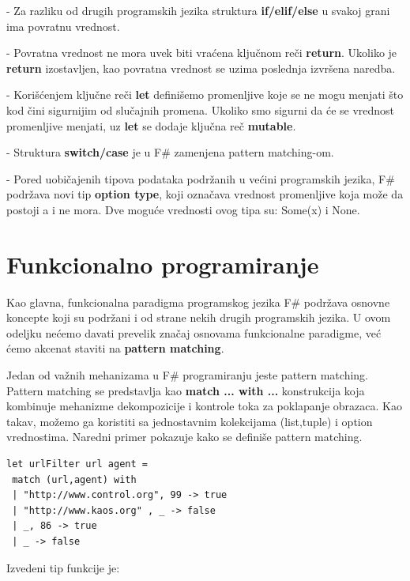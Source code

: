 \documentclass[a4paper]{article}
\begin{document}
	- Za razliku od drugih programskih jezika struktura \textbf{if/elif/else} u svakoj grani ima povratnu vrednost.
	 
	- Povratna vrednost ne mora uvek biti vraćena ključnom reči \textbf{return}. Ukoliko je \textbf{return} izostavljen, kao povratna vrednost se uzima poslednja izvršena naredba.
	 
	- Korišćenjem ključne reči \textbf{let} definišemo promenljive koje se ne mogu menjati što kod čini sigurnijim od slučajnih promena. Ukoliko smo sigurni da će se vrednost promenljive menjati, uz \textbf{let} se dodaje ključna reč \textbf{mutable}.
	 
	- Struktura \textbf{switch/case} je u F\# zamenjena pattern matching-om\cite{progFsPM}.
	 
	- Pored uobičajenih tipova podataka podržanih u većini programskih jezika, F\# podržava novi tip \textbf{option type}, koji označava vrednost promenljive koja može da postoji a i ne mora. Dve moguće vrednosti ovog tipa su: Some(x) i None. %

\section{Funkcionalno programiranje}


Kao glavna, funkcionalna paradigma programskog jezika F\# podržava osnovne koncepte koji su podržani i od strane nekih drugih programskih jezika. U ovom odeljku nećemo davati prevelik značaj osnovama funkcionalne paradigme, već ćemo akcenat staviti na \textbf{pattern matching}.

Jedan od važnih mehanizama u F\# programiranju jeste pattern matching. Pattern matching se predstavlja kao \textbf{match ... with ...} konstrukcija koja kombinuje mehanizme dekompozicije i kontrole toka za poklapanje obrazaca. Kao takav, možemo ga koristiti sa  jednostavnim kolekcijama (list,tuple) i option vrednostima. Naredni primer pokazuje kako se definiše pattern matching.
\\

\begin{lstlisting}
let urlFilter url agent =
 match (url,agent) with
 | "http://www.control.org", 99 -> true
 | "http://www.kaos.org" , _ -> false
 | _, 86 -> true
 | _ -> false
\end{lstlisting} 

Izvedeni tip funkcije je:
\end{document}
